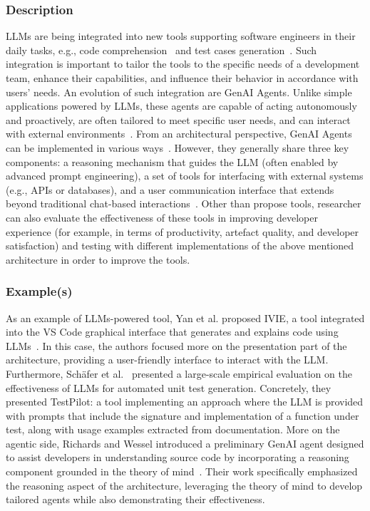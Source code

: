 \subsubsection{Description}

LLMs are being integrated into new tools supporting software engineers in their daily tasks, e.g., code comprehension~\cite{DBLP:conf/chi/YanHWH24} and test cases generation~\cite{DBLP:journals/tse/SchaferNET24}.
Such integration is important to tailor the tools to the specific needs of a development team, enhance their capabilities, and influence their behavior in accordance with users' needs.
An evolution of such integration are GenAI Agents.
Unlike simple applications powered by LLMs, these agents are capable of acting autonomously and proactively, are often tailored to meet specific user needs, and can interact with external environments~\cite{takerngsaksiri2024human,wiesinger2025agents}.
From an architectural perspective, GenAI Agents can be implemented in various ways~\cite{wiesinger2025agents}. However, they generally share three key components: a reasoning mechanism that guides the LLM (often enabled by advanced prompt engineering), a set of tools for interfacing with external systems (e.g., APIs or databases), and a user communication interface that extends beyond traditional chat-based interactions~\cite{DBLP:conf/icsm/RichardsW24, DBLP:journals/tmlr/SumersYN024, DBLP:journals/corr/abs-2309-07870}.
Other than propose tools, researcher can also evaluate the effectiveness of these tools in improving developer experience (for example, in terms of productivity, artefact quality, and developer satisfaction) and testing with different implementations of the above mentioned architecture in order to improve the tools.

\subsubsection{Example(s)}

As an example of LLMs-powered tool, Yan et al. proposed IVIE, a tool integrated into the VS Code graphical interface that generates and explains code using LLMs~\cite{DBLP:conf/chi/YanHWH24}. In this case, the authors focused more on the presentation part of the architecture, providing a user-friendly interface to interact with the LLM. 
Furthermore, Sch{\"{a}}fer et al.~\cite{DBLP:journals/tse/SchaferNET24} presented a large-scale empirical evaluation on the effectiveness of LLMs for automated unit test generation. Concretely, they presented TestPilot: a tool implementing an approach where the LLM is provided with prompts that include the signature and implementation of a function under test, along with usage examples extracted from documentation.
More on the agentic side, Richards and Wessel introduced a preliminary GenAI agent designed to assist developers in understanding source code by incorporating a reasoning component grounded in the theory of mind~\cite{DBLP:conf/icsm/RichardsW24}. Their work specifically emphasized the reasoning aspect of the architecture, leveraging the theory of mind to develop tailored agents while also demonstrating their effectiveness.


